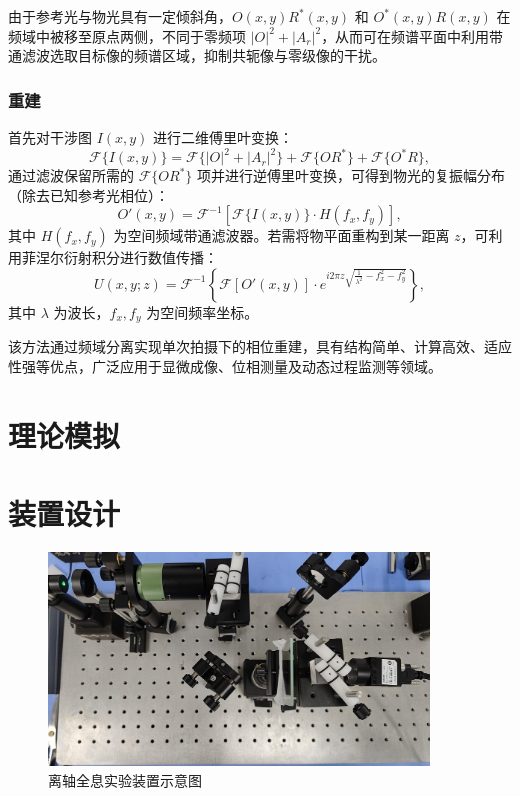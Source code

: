 \documentclass[a4paper,draft]{report} %
\begin{document}
由于参考光与物光具有一定倾斜角，$O(x,y) R^*(x,y)$ 和 $O^*(x,y) R(x,y)$ 在频域中被移至原点两侧，不同于零频项 $|O|^2 + |A_r|^2$，从而可在频谱平面中利用带通滤波选取目标像的频谱区域，抑制共轭像与零级像的干扰。
\subsection{重建}
首先对干涉图 $I(x,y)$ 进行二维傅里叶变换：
\begin{equation}
\mathcal{F}\{I(x,y)\} = \mathcal{F}\{|O|^2 + |A_r|^2\} + \mathcal{F}\{O R^*\} + \mathcal{F}\{O^* R\},
\end{equation}
通过滤波保留所需的 $\mathcal{F}\{O R^*\}$ 项并进行逆傅里叶变换，可得到物光的复振幅分布（除去已知参考光相位）：
\begin{equation}
O'(x,y) = \mathcal{F}^{-1} \left[ \mathcal{F}\{I(x,y)\} \cdot H(f_x,f_y) \right],
\end{equation}
其中 $H(f_x,f_y)$ 为空间频域带通滤波器。若需将物平面重构到某一距离 $z$，可利用菲涅尔衍射积分进行数值传播：
\begin{equation}
U(x,y;z) = \mathcal{F}^{-1} \left\{ \mathcal{F}[O'(x,y)] \cdot e^{i 2\pi z \sqrt{\frac{1}{\lambda^2} - f_x^2 - f_y^2}} \right\},
\end{equation}
其中 $\lambda$ 为波长，$f_x,f_y$ 为空间频率坐标。

该方法通过频域分离实现单次拍摄下的相位重建，具有结构简单、计算高效、适应性强等优点，广泛应用于显微成像、位相测量及动态过程监测等领域。

\chapter{理论模拟}

\chapter{装置设计}

\begin{figure}[H]
    \centering
    \includegraphics[width=0.9\textwidth]{expreiment}
    \caption{离轴全息实验装置示意图}
    \label{fig:experiment} %
\end{figure}
\end{document}
